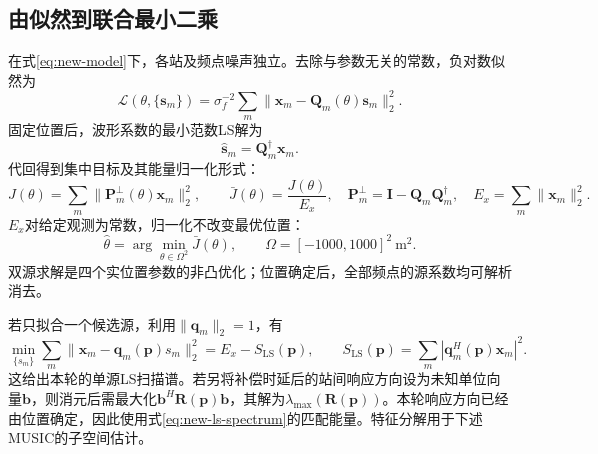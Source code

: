 \subsection{由似然到联合最小二乘}
在式\eqref{eq:new-model}下，各站及频点噪声独立。去除与参数无关的常数，负对数似然为
\begin{equation}
\mathcal L(\theta,\{\mathbf s_m\})=\sigma_f^{-2}\sum_m\|\mathbf x_m-\mathbf Q_m(\theta)\mathbf s_m\|_2^2.
\end{equation}
固定位置后，波形系数的最小范数LS解为
\begin{equation}\label{eq:2.8}
\widehat{\mathbf s}_m=\mathbf Q_m^\dagger\mathbf x_m.
\end{equation}
代回得到集中目标及其能量归一化形式：
\begin{equation}\label{eq:new-joint}
J(\theta)=\sum_m\|\mathbf P_m^\perp(\theta)\mathbf x_m\|_2^2,\qquad
\bar J(\theta)=\frac{J(\theta)}{E_x},\quad
\mathbf P_m^\perp=\mathbf I-\mathbf Q_m\mathbf Q_m^\dagger,\quad
E_x=\sum_m\|\mathbf x_m\|_2^2.
\end{equation}
$E_x$对给定观测为常数，归一化不改变最优位置：
\begin{equation}\label{eq:2.7}
\widehat\theta=\arg\min_{\theta\in\Omega^2}\bar J(\theta),\qquad\Omega=[-1000,1000]^2\ \mathrm{m}^2.
\end{equation}
双源求解是四个实位置参数的非凸优化；位置确定后，全部频点的源系数均可解析消去。

若只拟合一个候选源，利用$\|\mathbf q_m\|_2=1$，有
\begin{equation}\label{eq:new-ls-spectrum}
\min_{\{s_m\}}\sum_m\|\mathbf x_m-\mathbf q_m(\mathbf p)s_m\|_2^2
=E_x-S_{\mathrm{LS}}(\mathbf p),\qquad
S_{\mathrm{LS}}(\mathbf p)=\sum_m|\mathbf q_m^H(\mathbf p)\mathbf x_m|^2.
\end{equation}
这给出本轮的单源LS扫描谱。若另将补偿时延后的站间响应方向设为未知单位向量$\mathbf b$，则消元后需最大化$\mathbf b^H\mathbf R(\mathbf p)\mathbf b$，其解为$\lambda_{\max}(\mathbf R(\mathbf p))$。本轮响应方向已经由位置确定，因此使用式\eqref{eq:new-ls-spectrum}的匹配能量。特征分解用于下述MUSIC的子空间估计。

